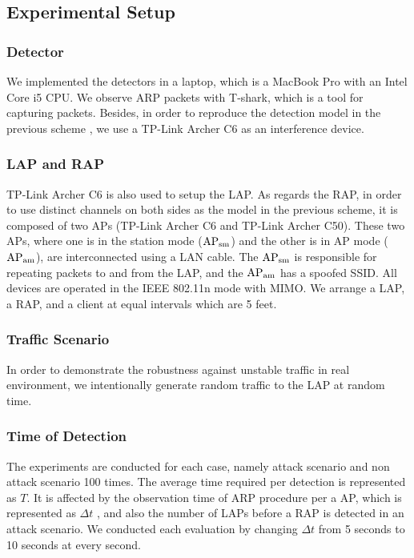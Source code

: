 \documentclass[conference]{IEEEtran}
\begin{document}
\subsection{Experimental Setup}
\subsubsection{Detector}
We implemented the detectors in a laptop, which is a MacBook Pro with an Intel Core i5 CPU.
We observe ARP packets with T-shark, which is a tool for capturing packets\cite{wire}.
Besides, in order to reproduce the detection model in the previous scheme \cite{previous}, we use a TP-Link Archer C6 as an interference device.

\subsubsection{LAP and RAP}
TP-Link Archer C6 is also used to setup the LAP.
As regards the RAP, in order to use distinct channels on both sides as the model in the previous scheme, it is composed of two APs (TP-Link Archer C6 and TP-Link Archer C50).
These two APs, where one is in the station mode ($\rm AP_{sm}$) and the other is in AP mode ($\rm AP_{am}$), are interconnected using a LAN cable.
The $\rm AP_{sm}$ is responsible for repeating packets to and from the LAP, and the $\rm AP_{am}$ has a spoofed SSID.
All devices are operated in the IEEE 802.11n mode with MIMO.
We arrange a LAP, a RAP, and a client at equal intervals which are 5 feet.

\subsubsection{Traffic Scenario}
In order to demonstrate the robustness against unstable traffic in real environment, we intentionally generate random traffic to the LAP at random time.

\subsubsection{Time of Detection}
The experiments are conducted for each case, namely attack scenario and non attack scenario 100 times.
The average time required per detection is represented as $T$.
It is affected by the observation time of ARP procedure per a AP, which is represented as $\Delta t$ , and also the number of LAPs before a RAP is detected in an attack scenario.
We conducted each evaluation by changing $\Delta t$ from 5 seconds to 10 seconds at every second.
\end{document}
